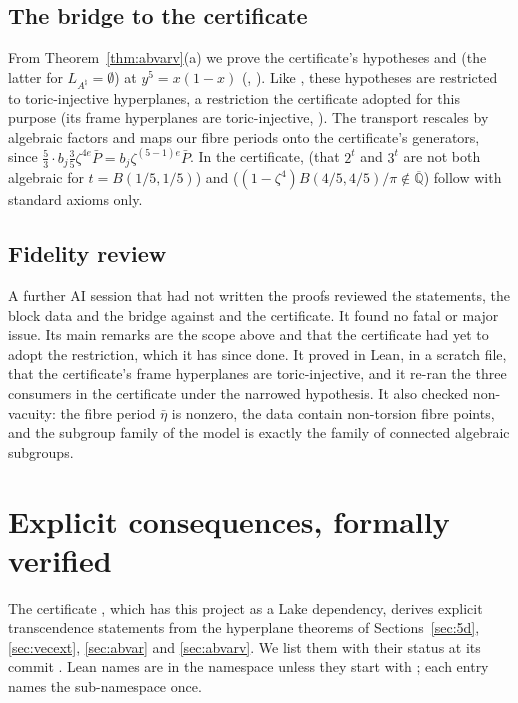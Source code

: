 \documentclass[11pt]{amsart}
\theoremstyle{definition}
\theoremstyle{remark}
\numberwithin{equation}{section}
\newcommand{\Qbar}{\overline{\mathbb{Q}}}
\begin{document}
\subsection{The bridge to the certificate}
From Theorem~\ref{thm:abvarv}(a) we prove the certificate's hypotheses  and
 (the latter for $L_{A^\natural}=\emptyset$) at $y^5=x(1-x)$
(, ). Like , these hypotheses are restricted to
toric-injective hyperplanes, a restriction the certificate adopted for this purpose (its frame hyperplanes are
toric-injective, ). The transport rescales by algebraic factors and maps our fibre periods onto
the certificate's generators, since $\frac53\cdot b_j\frac35\zeta^{4e}\bar P=b_j\zeta^{(5-1)e}\bar P$. In
the certificate,  (that $2^t$ and $3^t$ are not both algebraic for $t=B(1/5,1/5)$) and
 ($(1-\zeta^4)B(4/5,4/5)/\pi\notin\Qbar$) follow with standard axioms only.

\subsection{Fidelity review}
A further AI session that had not written the proofs reviewed the statements, the block data and the bridge against
\cite[pp.~385--386, 394--395]{W88} and the certificate. It found no fatal or major issue. Its main remarks are the
scope above and that the certificate had yet to adopt the restriction, which it has since done. It proved in Lean, in a scratch file, that
the certificate's frame hyperplanes are toric-injective, and it re-ran the three consumers in the certificate under the
narrowed hypothesis. It also checked non-vacuity: the fibre period $\bar\eta$ is nonzero, the data contain non-torsion
fibre points, and the subgroup family of the model is exactly the family of connected algebraic subgroups.

\section{Explicit consequences, formally verified}\label{sec:conseq}

The certificate \cite{LeanMstar}, which has this project as a Lake dependency, derives explicit
transcendence statements from the hyperplane theorems of Sections~\ref{sec:5d}, \ref{sec:vecext}, \ref{sec:abvar} and
\ref{sec:abvarv}. We list them with their status at its commit . Lean names are in the namespace 
unless they start with ; each entry names the sub-namespace once.
\end{document}
